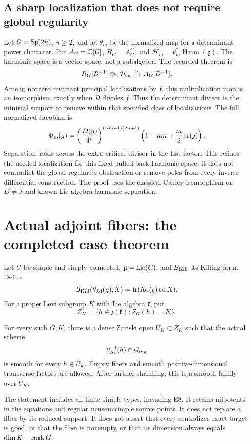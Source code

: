\subsection{A sharp localization that does not require global regularity}
Let $G=\operatorname{Sp}(2n)$, $n\ge2$, and let $\theta_m$ be the normalized map for a determinant-power character. Put $A_G=\mathbb C[G]$, $R_G=A_G^G$, and $\mathcal H_m=\theta_m^*\operatorname{Harm}(\mathfrak g)$. The harmonic space is a vector space, not a subalgebra. The recorded theorem is
\[
 R_G[D^{-1}]\otimes_\mathbb C\mathcal H_m\xrightarrow{\sim} A_G[D^{-1}].
\]
Among nonzero invariant principal localizations by $f$, this multiplication map is an isomorphism exactly when $D$ divides $f$. Thus the determinant divisor is the minimal support to remove within that specified class of localizations. The full normalized Jacobian is
\[
 \Psi_m(g)=\left(\frac{D(g)}{4^n}\right)^{(nm-1)(2n+1)}
 \left(1-nm+\frac m2\operatorname{tr}(g)\right).
\]
Separation holds across the extra critical divisor in the last factor. This refines the needed localization for this fixed pulled-back harmonic space; it does not contradict the global regularity obstruction or remove poles from every inverse-differential construction. The proof uses the classical Cayley isomorphism on $D\ne0$ and known Lie-algebra harmonic separation.


\section{Actual adjoint fibers: the completed case theorem}
Let $G$ be simple and simply connected, $\mathfrak g=\operatorname{Lie}(G)$, and $B_{\rm Kill}$ its Killing form. Define
\[
 B_{\rm Kill}(\theta_{\mathrm{Ad}}(g),X)
 =\operatorname{tr}(\operatorname{Ad}(g)\operatorname{ad}X).
\]
For a proper Levi subgroup $K$ with Lie algebra $\mathfrak k$, put
\[
 Z_K^\circ=\{h\in\mathfrak z(\mathfrak k):Z_G(h)=K\}.
\]
\begin{theorem}
For every such $G,K$, there is a dense Zariski open $U_K\subset Z_K^\circ$ such that the actual scheme
\[
 \theta_{\mathrm{Ad}}^{-1}(h)\cap G_{\mathrm{reg}}
\]
is smooth for every $h\in U_K$. Empty fibers and smooth positive-dimensional transverse factors are allowed. After further shrinking, this is a smooth family over $U_K$.
\end{theorem}
The statement includes all finite simple types, including E8. It retains nilpotents in the equations and regular nonsemisimple source points. It does not replace a fiber by its reduced support. It does not assert that every centralizer-exact target is good, or that the fiber is nonempty, or that its dimension always equals $\dim K-\operatorname{rank} G$.

